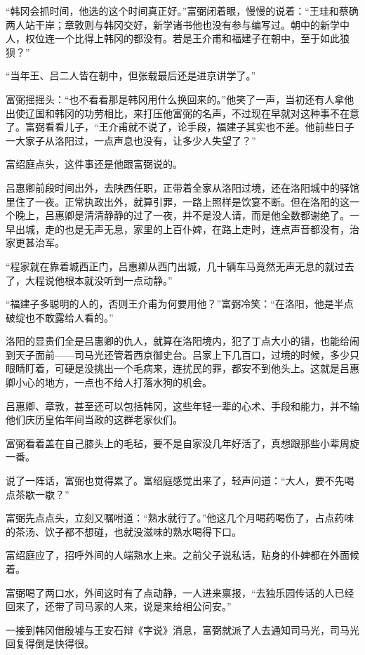 “韩冈会抓时间，他选的这个时间真正好。”富弼闭着眼，慢慢的说着：“王珪和蔡确两人站干岸；章敦则与韩冈交好，新学诸书他也没有参与编写过。朝中的新学中人，权位连一个比得上韩冈的都没有。若是王介甫和福建子在朝中，至于如此狼狈？”

“当年王、吕二人皆在朝中，但张载最后还是进京讲学了。”

富弼摇摇头：“也不看看那是韩冈用什么换回来的。”他笑了一声，当初还有人拿他出使辽国和韩冈的功劳相比，来打压他富弼的名声，不过现在早就对这种事不在意了。富弼看看儿子，“王介甫就不说了，论手段，福建子其实也不差。他前些日子一大家子从洛阳过，一点声息也没有，让多少人失望了？”

富绍庭点头，这件事还是他跟富弼说的。

吕惠卿前段时间出外，去陕西任职，正带着全家从洛阳过境，还在洛阳城中的驿馆里住了一夜。正常执政出外，就算引罪，一路上照样是饮宴不断。但在洛阳的这一个晚上，吕惠卿是清清静静的过了一夜，并不是没人请，而是他全数都谢绝了。一早出城，走的也是无声无息，家里的上百仆婢，在路上走时，连点声音都没有，治家更甚治军。

“程家就在靠着城西正门，吕惠卿从西门出城，几十辆车马竟然无声无息的就过去了，大程说他根本就没听到一点动静。”

“福建子多聪明的人的，否则王介甫为何要用他？”富弼冷笑：“在洛阳，他是半点破绽也不敢露给人看的。”

洛阳的显贵们全是吕惠卿的仇人，就算在洛阳境内，犯了丁点大小的错，也能给闹到天子面前——司马光还管着西京御史台。吕家上下几百口，过境的时候，多少只眼睛盯着，可硬是没挑出一个毛病来，连扰民的罪，都安不到他头上。这就是吕惠卿小心的地方，一点也不给人打落水狗的机会。

吕惠卿、章敦，甚至还可以包括韩冈，这些年轻一辈的心术、手段和能力，并不输他们庆历皇佑年间当政的这群老家伙们。

富弼看着盖在自己膝头上的毛毡，要不是自家没几年好活了，真想跟那些小辈周旋一番。

说了一阵话，富弼也觉得累了。富绍庭感觉出来了，轻声问道：“大人，要不先喝点茶歇一歇？”

富弼先点点头，立刻又嘱咐道：“熟水就行了。”他这几个月喝药喝伤了，占点药味的茶汤、饮子都不想碰，也就没滋味的熟水喝得下口。

富绍庭应了，招呼外间的人端熟水上来。之前父子说私话，贴身的仆婢都在外面候着。

富弼喝了两口水，外间这时有了点动静，一人进来禀报，“去独乐园传话的人已经回来了，还带了司马家的人来，说是来给相公问安。”

一接到韩冈借殷墟与王安石辩《字说》消息，富弼就派了人去通知司马光，司马光回复得倒是快得很。

